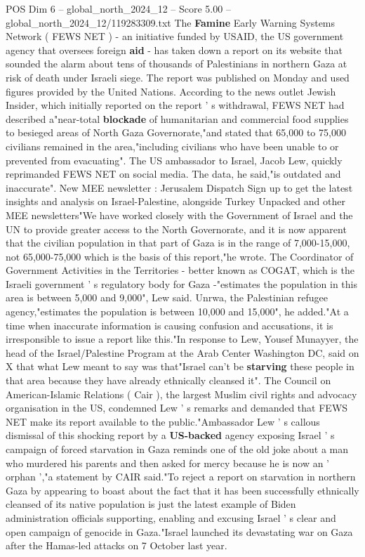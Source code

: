 \begin{textsample}{POS Dim 6 – global\_north\_2024\_12 – Score 5.00 – global\_north\_2024\_12/119283309.txt}  \label{ex:f6_pos_269}
The \textbf{Famine} Early Warning Systems Network ( FEWS NET ) - an initiative funded by USAID, the US government agency that oversees foreign \textbf{aid} - has taken down a report on its website that sounded the alarm about tens of thousands of Palestinians in northern Gaza at risk of death under Israeli siege.
The report was published on Monday and used figures provided by the United Nations.
According to the news outlet Jewish Insider, which initially reported on the report ' s withdrawal, FEWS NET had described a"near-total \textbf{blockade} of humanitarian and commercial food supplies to besieged areas of North Gaza Governorate,"and stated that 65,000 to 75,000 civilians remained in the area,"including civilians who have been unable to or prevented from evacuating".
The US ambassador to Israel, Jacob Lew, quickly reprimanded FEWS NET on social media.
The data, he said,"is outdated and inaccurate".
New MEE newsletter : Jerusalem Dispatch Sign up to get the latest insights and analysis on Israel-Palestine, alongside Turkey Unpacked and other MEE newsletters"We have worked closely with the Government of Israel and the UN to provide greater access to the North Governorate, and it is now apparent that the civilian population in that part of Gaza is in the range of 7,000-15,000, not 65,000-75,000 which is the basis of this report,"he wrote.
The Coordinator of Government Activities in the Territories - better known as COGAT, which is the Israeli government ' s regulatory body for Gaza -"estimates the population in this area is between 5,000 and 9,000", Lew said.
Unrwa, the Palestinian refugee agency,"estimates the population is between 10,000 and 15,000", he added."At a time when inaccurate information is causing confusion and accusations, it is irresponsible to issue a report like this."In response to Lew, Yousef Munayyer, the head of the Israel/Palestine Program at the Arab Center Washington DC, said on X that what Lew meant to say was that"Israel can't be \textbf{starving} these people in that area because they have already ethnically cleansed it".
The Council on American-Islamic Relations ( Cair ), the largest Muslim civil rights and advocacy organisation in the US, condemned Lew ' s remarks and demanded that FEWS NET make its report available to the public."Ambassador Lew ' s callous dismissal of this shocking report by a \textbf{US-backed} agency exposing Israel ' s campaign of forced starvation in Gaza reminds one of the old joke about a man who murdered his parents and then asked for mercy because he is now an ' orphan ',"a statement by CAIR said."To reject a report on starvation in northern Gaza by appearing to boast about the fact that it has been successfully ethnically cleansed of its native population is just the latest example of Biden administration officials supporting, enabling and excusing Israel ' s clear and open campaign of genocide in Gaza."Israel launched its devastating war on Gaza after the Hamas-led attacks on 7 October last year.

\end{textsample}

